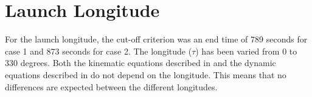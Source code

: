 
%



%
% 


\section{Launch Longitude}
\label{sec:launchLongitude}
For the launch longitude, the cut-off criterion was an end time of 789 seconds for case 1 and 873 seconds for case 2. The longitude ($\tau$) has been varied from 0 to 330 degrees. Both the kinematic equations described in  and the dynamic equations described in  do not depend on the longitude. This means that no differences are expected between the different longitudes. \\

